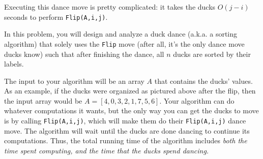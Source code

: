 \documentclass[12pt]{article}
\begin{document}
Executing this dance move is pretty complicated: it takes the ducks $O(j - i)$ seconds to perform \texttt{Flip(A,i,j)}. 

In this problem, you will design and analyze a duck dance (a.k.a. a sorting algorithm) that solely uses the \texttt{Flip} move (after all, it's the only dance move ducks know) such that after finishing the dance, all $n$ ducks are sorted by their labels. 

The input to your algorithm will be an array $A$ that contains the ducks' values. As an example, if the ducks were organized as pictured above after the flip, then the input array would be $A = [4,0,3,2,1,7,5,6]$.
Your algorithm can do whatever computations it wants, but the only way you can get the ducks to move is by calling \texttt{Flip(A,i,j)}, which will make them do their \texttt{Flip(A,i,j)} dance move.
The algorithm will wait until the ducks are done dancing to continue its computations.
Thus, the total running time of the algorithm includes \em both \em the time spent computing, and the time that the ducks spend dancing.
\end{document}
